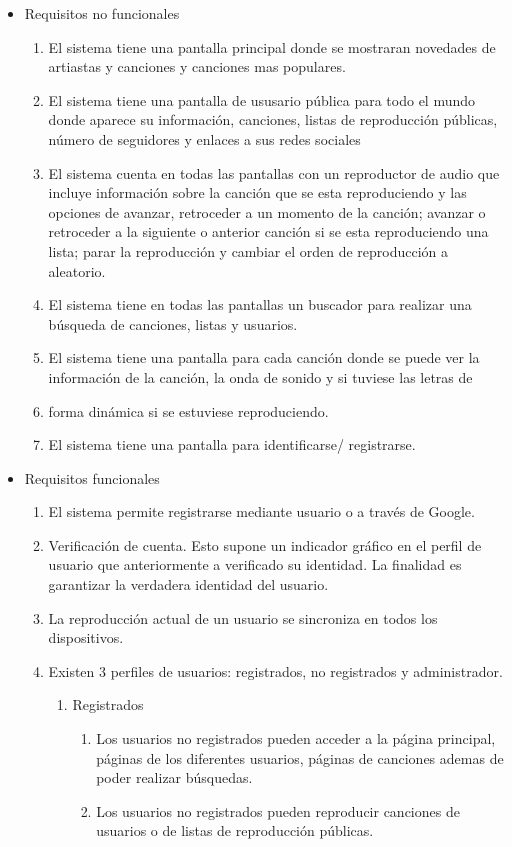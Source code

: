 \begin{itemize}

\item Requisitos no funcionales
\begin{enumerate}
\item El sistema tiene una pantalla principal donde se mostraran novedades de artiastas y canciones y canciones mas populares.
\item El sistema tiene una pantalla de ususario pública para todo el mundo donde aparece su información, canciones, listas de reproducción públicas, número de seguidores y enlaces a sus redes sociales
\item El sistema cuenta en todas las pantallas con un reproductor de audio que incluye información sobre la canción que se esta reproduciendo y las opciones de avanzar, retroceder a un momento de la canción; avanzar o retroceder a la siguiente o anterior canción si se esta reproduciendo una lista; parar la reproducción y cambiar el orden de reproducción a aleatorio.
\item El sistema tiene en todas las pantallas un buscador para realizar una búsqueda de canciones, listas y usuarios.
\item El sistema tiene una pantalla para cada canción donde se puede ver la  información de la canción, la onda de sonido y si tuviese las letras de \item forma dinámica si se estuviese reproduciendo.
\item El sistema tiene una pantalla para identificarse/ registrarse.
\end{enumerate}

\item Requisitos funcionales 
\begin{enumerate}
\item El sistema permite registrarse mediante usuario o a través de Google.
\item Verificación de cuenta. Esto supone un indicador gráfico en el perfil de usuario que anteriormente a verificado su identidad. La finalidad es garantizar la verdadera identidad del usuario.
\item La reproducción actual de un usuario se sincroniza en todos los dispositivos.

\item Existen 3 perfiles de usuarios: registrados, no registrados y administrador.
    \begin{enumerate}
	\item Registrados
	    \begin{enumerate}
	        \item Los usuarios no registrados pueden acceder a la página principal, páginas de los diferentes usuarios, páginas de canciones ademas de poder realizar búsquedas.
	        \item Los usuarios no registrados pueden reproducir canciones de usuarios o de listas de reproducción públicas.
	

\end{enumerate}
\end{enumerate}
\end{enumerate}
\end{itemize}
